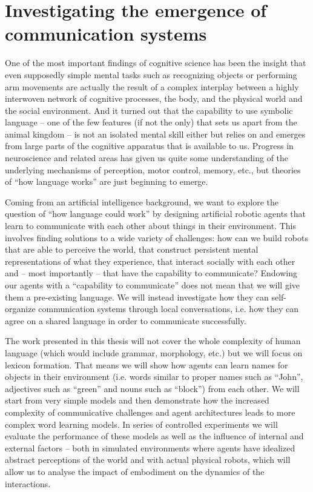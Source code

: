 
\chapter{Investigating the emergence of communication systems}

One of the most important findings of cognitive science has been the
insight that even supposedly simple mental tasks such as recognizing
objects or performing arm movements are actually the result of a
complex interplay between a highly interwoven network of cognitive
processes, the body, and the physical world and the social
environment. And it turned out that the capability to use symbolic
language -- one of the few features (if not the only) that sets us
apart from the animal kingdom -- is not an isolated mental skill
either but relies on and emerges from large parts of the cognitive
apparatus that is available to us. Progress in neuroscience and
related areas has given us quite some understanding of the underlying
mechanisms of perception, motor control, memory, etc., but theories of
``how language works'' are just beginning to emerge.

Coming from an artificial intelligence background, we want to explore
the question of ``how language could work'' by designing artificial
robotic agents that learn to communicate with each other about things
in their environment. This involves finding solutions to a wide
variety of challenges: how can we build robots that are able to
perceive the world, that construct persistent mental representations
of what they experience, that interact socially with each other and --
most importantly -- that have the capability to communicate? Endowing
our agents with a ``capability to communicate'' does not mean that we
will give them a pre-existing language. We will instead investigate
how they can self-organize communication systems through local
conversations, i.e. how they can agree on a shared language in order
to communicate successfully. 

The work presented in this thesis will not cover the whole complexity
of human language (which would include grammar, morphology, etc.) but
we will focus on lexicon formation. That means we will show how agents
can learn names for objects in their environment (i.e. words similar
to proper names such as ``John'', adjectives such as ``green'' and
nouns such as ``block'') from each other. We will start from very
simple models and then demonstrate how the increased complexity of
communicative challenges and agent architectures leads to more complex
word learning models. In series of controlled experiments we will
evaluate the performance of these models as well as the influence of
internal and external factors -- both in simulated environments where
agents have idealized abstract perceptions of the world and with
actual physical robots, which will allow us to analyse the impact of
embodiment on the dynamics of the interactions.


